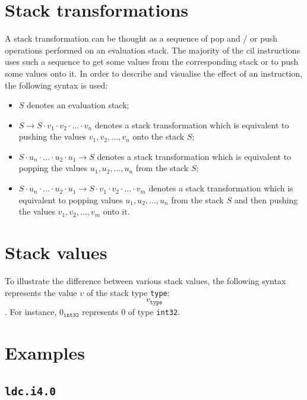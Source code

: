 \documentclass[declaration,shortabstract,english,mgr]{iithesis}
\newcommand{\sval}[2] {
	#1_\texttt{#2}
}
\begin{document}
\section{Stack transformations}
\label{sec:stackTransformations}

A stack transformation can be thought as a sequence of pop and / or push operations performed on an evaluation stack. The majority of the \acrshort{cil} instructions uses such a sequence to get some values from the corresponding stack or to push some values onto it. In order to describe and visualise the effect of an instruction, the following syntax is used:
\begin{itemize}
	\item{$S$ denotes an evaluation stack;}
	\item{$S \rightarrow S \cdot v_1 \cdot v_2 \cdot ... \cdot v_n$ denotes a stack transformation which is equivalent to pushing the values $v_1, v_2, ..., v_n$ onto the stack $S$;}
	\item{$S \cdot u_n \cdot ... \cdot u_2 \cdot u_1 \rightarrow S$ denotes a stack transformation which is equivalent to popping the values $u_1, u_2, ..., u_n$ from the stack $S$;}
	\item{$S \cdot u_n \cdot ... \cdot u_2 \cdot u_1 \rightarrow S \cdot v_1 \cdot v_2 \cdot ... \cdot v_m$ denotes a stack transformation which is equivalent to popping values $u_1, u_2, ..., u_n$ from the stack $S$ and then pushing the values $v_1, v_2, ..., v_m$ onto it.}
\end{itemize}

\section{Stack values}

To illustrate the difference between various stack values, the following syntax represents the value $v$ of the stack type \texttt{type}:
$$
	\sval{v}{type}
$$.
For instance, $\sval{0}{int32}$ represents $0$ of type \texttt{int32}.

\section{Examples}
\label{sec:instruction_examples}

\subsection{\texttt{ldc.i4.0}}
\label{sec:desc_ldci40}
\end{document}
